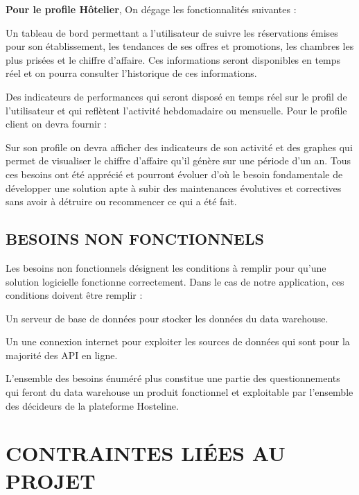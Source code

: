 \textbf{Pour le profile Hôtelier}, On dégage les fonctionnalités suivantes : 
   \begin{list}{•}{ }
   \item Un tableau de bord permettant a l’utilisateur de suivre les réservations émises pour son établissement, les tendances de ses offres et promotions, les chambres les plus prisées et le chiffre d’affaire. Ces informations seront disponibles en temps réel et on pourra consulter l’historique de ces informations.
   \item Des indicateurs de performances qui seront disposé en temps réel sur le profil de l’utilisateur et qui reflètent l’activité hebdomadaire ou mensuelle.
Pour le profile client on devra fournir :
   \item Sur son profile on devra afficher des indicateurs de son activité et des graphes qui permet de visualiser le chiffre d’affaire qu’il génère sur une période d'un an.
Tous ces besoins ont été apprécié et pourront évoluer d’où le besoin fondamentale de développer une solution apte à subir des maintenances évolutives et correctives sans avoir à détruire ou recommencer ce qui a été fait.
\end{list}



 \subsection{BESOINS NON FONCTIONNELS}
 
 Les besoins non fonctionnels désignent les conditions à remplir pour qu’une solution logicielle fonctionne correctement. Dans le cas de notre application, ces conditions doivent être remplir :
 \begin{list}{•}{ }
 \item Un serveur de base de données pour stocker les données du data warehouse.
 \item Un une connexion internet pour exploiter les sources de données qui sont pour la majorité des API en ligne.\\
 \end{list}


L'ensemble des besoins énuméré plus constitue une partie des questionnements qui feront du data warehouse  un produit fonctionnel et exploitable par l’ensemble des décideurs de la plateforme Hosteline.

 \cleardoublepage
 \section{CONTRAINTES LIÉES AU PROJET}
 
